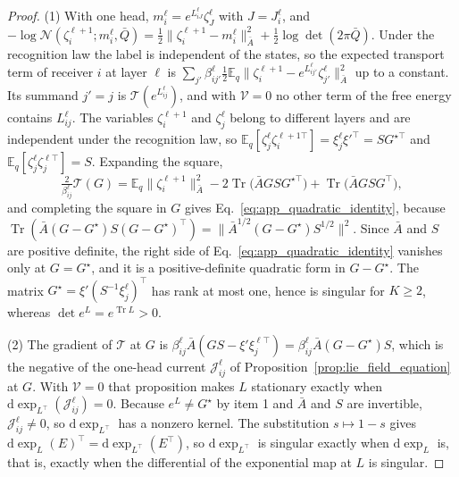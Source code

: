 \documentclass[twoside,11pt]{article}
\begin{document}
\begin{proof}
(1) With one head, $m_i^\ell=e^{L_{iJ}^\ell}\zeta_J^\ell$ with $J=J_i^\ell$, and $-\log\mathcal N(\zeta_i^{\ell+1};m_i^\ell,\bar Q)=\tfrac12\|\zeta_i^{\ell+1}-m_i^\ell\|_{\bar A}^2+\tfrac12\log\det(2\pi\bar Q)$. Under the recognition law the label is independent of the states, so the expected transport term of receiver $i$ at layer $\ell$ is $\sum_{j'}\beta_{ij'}^\ell\tfrac12\mathbb E_q\|\zeta_i^{\ell+1}-e^{L_{ij'}^\ell}\zeta_{j'}^\ell\|_{\bar A}^2$ up to a constant. Its summand $j'=j$ is $\mathcal T(e^{L_{ij}^\ell})$, and with $\mathcal V=0$ no other term of the free energy contains $L_{ij}^\ell$. The variables $\zeta_i^{\ell+1}$ and $\zeta_j^\ell$ belong to different layers and are independent under the recognition law, so $\mathbb E_q[\zeta_j^\ell\zeta_i^{\ell+1\top}]=\xi_j^\ell\xi'^\top=SG^{\star\top}$ and $\mathbb E_q[\zeta_j^\ell\zeta_j^{\ell\top}]=S$. Expanding the square,
\begin{equation*}
\tfrac2{\beta_{ij}^\ell}\mathcal T(G)=\mathbb E_q\|\zeta_i^{\ell+1}\|_{\bar A}^2-2\operatorname{Tr}\bigl(\bar AGSG^{\star\top}\bigr)+\operatorname{Tr}\bigl(\bar AGSG^\top\bigr),
\end{equation*}
and completing the square in $G$ gives Eq.~\eqref{eq:app_quadratic_identity}, because $\operatorname{Tr}(\bar A(G-G^\star)S(G-G^\star)^\top)=\|\bar A^{1/2}(G-G^\star)S^{1/2}\|^2$. Since $\bar A$ and $S$ are positive definite, the right side of Eq.~\eqref{eq:app_quadratic_identity} vanishes only at $G=G^\star$, and it is a positive-definite quadratic form in $G-G^\star$. The matrix $G^\star=\xi'(S^{-1}\xi_j^\ell)^\top$ has rank at most one, hence is singular for $K\ge2$, whereas $\det e^L=e^{\operatorname{Tr}L}>0$.

(2) The gradient of $\mathcal T$ at $G$ is $\beta_{ij}^\ell\bar A(GS-\xi'\xi_j^{\ell\top})=\beta_{ij}^\ell\bar A(G-G^\star)S$, which is the negative of the one-head current $\mathcal J_{ij}^\ell$ of Proposition~\ref{prop:lie_field_equation} at $G$. With $\mathcal V=0$ that proposition makes $L$ stationary exactly when $\mathrm d\exp_{L^\top}(\mathcal J_{ij}^\ell)=0$. Because $e^L\ne G^\star$ by item 1 and $\bar A$ and $S$ are invertible, $\mathcal J_{ij}^\ell\ne0$, so $\mathrm d\exp_{L^\top}$ has a nonzero kernel. The substitution $s\mapsto1-s$ gives $\mathrm d\exp_{L}(E)^\top=\mathrm d\exp_{L^\top}(E^\top)$, so $\mathrm d\exp_{L^\top}$ is singular exactly when $\mathrm d\exp_{L}$ is, that is, exactly when the differential of the exponential map at $L$ is singular.


\end{proof}
\end{document}

